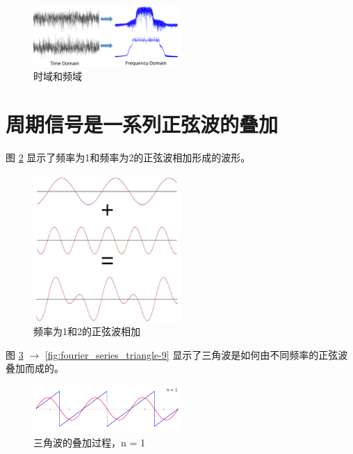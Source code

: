 \documentclass[lang=cn,newtx,10pt,scheme=chinese]{elegantbook}
\begin{document}
\begin{figure}[!htb]
\centering
\includegraphics[width=0.5\textwidth]{time_and_freq_domain_example_signals.png}
\caption{时域和频域}
\label{fig:time_and_freq_domain_example_signals}
\end{figure}

\section{周期信号是一系列正弦波的叠加}

图 \ref{fig:summing_sinusoids} 显示了频率为1和频率为2的正弦波相加形成的波形。

\begin{figure}[!htb]
\centering
\includegraphics[width=0.5\textwidth]{summing_sinusoids.pdf}
\caption{频率为1和2的正弦波相加}
\label{fig:summing_sinusoids}
\end{figure}

图 \ref{fig:fourier_series_triangle-0} $\rightarrow$ \ref{fig:fourier_series_triangle-9} 显示了三角波是如何由不同频率的正弦波叠加而成的。

\begin{figure}[!htb]
\centering
\includegraphics[width=0.5\textwidth]{fourier_series_triangle-0.png}
\caption{三角波的叠加过程，n = 1}
\label{fig:fourier_series_triangle-0}
\end{figure}
\end{document}
